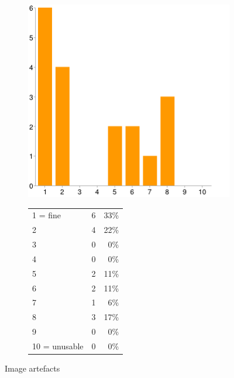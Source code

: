 \documentclass[MSc,paper=a4,pagesize=auto]{icldt}
\begin{document}
\begin{figure}[htbp!]
\centering
\begin{subfigure}{0.4\textwidth}
    \centering
    \includegraphics[width=1\linewidth]{resources/14-image_artefacts}
\end{subfigure}%
\centering
\begin{subfigure}{\textwidth}
    \centering
   	\begin{tabular}{ l c r }
1 = fine&6&33\% \\
2&4&22\% \\
3&0&0\% \\
4&0&0\% \\
5&2&11\% \\
6&2&11\% \\
7&1&6\% \\
8&3&17\% \\
9&0&0\% \\
10 = unusable&0&0\% \\
\end{tabular}
\end{subfigure} 
    \caption{Image artefacts}
    \label{fig:14-image_artefacts}
\end{figure}
\end{document}
